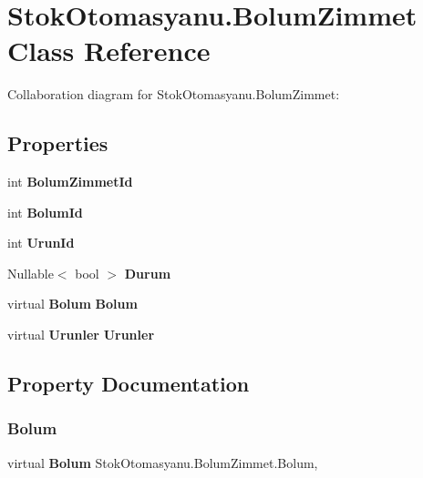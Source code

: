 \section{Stok\+Otomasyanu.\+Bolum\+Zimmet Class Reference}
\label{class_stok_otomasyanu_1_1_bolum_zimmet}


Collaboration diagram for Stok\+Otomasyanu.\+Bolum\+Zimmet\+:
\subsection*{Properties}
\begin{DoxyCompactItemize}
\item 
int \textbf{ Bolum\+Zimmet\+Id}\hspace{0.3cm}{\ttfamily  [get, set]}
\item 
int \textbf{ Bolum\+Id}\hspace{0.3cm}{\ttfamily  [get, set]}
\item 
int \textbf{ Urun\+Id}\hspace{0.3cm}{\ttfamily  [get, set]}
\item 
Nullable$<$ bool $>$ \textbf{ Durum}\hspace{0.3cm}{\ttfamily  [get, set]}
\item 
virtual \textbf{ Bolum} \textbf{ Bolum}\hspace{0.3cm}{\ttfamily  [get, set]}
\item 
virtual \textbf{ Urunler} \textbf{ Urunler}\hspace{0.3cm}{\ttfamily  [get, set]}
\end{DoxyCompactItemize}


\subsection{Property Documentation}
\mbox{\label{class_stok_otomasyanu_1_1_bolum_zimmet_a0d258fb01e7868e8033d96c1351febdc}} 
\subsubsection{Bolum}
{\footnotesize\ttfamily virtual \textbf{ Bolum} Stok\+Otomasyanu.\+Bolum\+Zimmet.\+Bolum\hspace{0.3cm}{\ttfamily [get]}, {\ttfamily [set]}}

